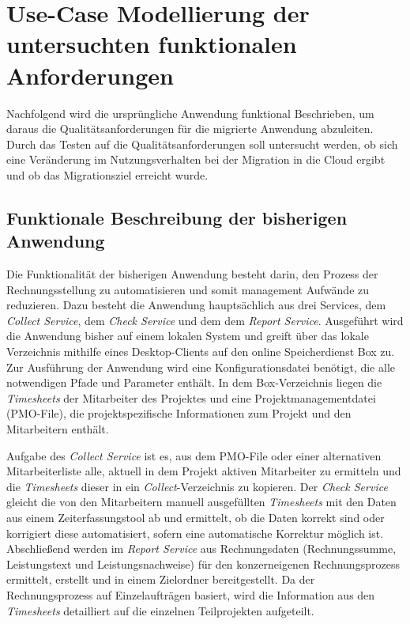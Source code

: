 \section{Use-Case Modellierung der untersuchten funktionalen Anforderungen}
\label{sec:use-case-modellierung}

Nachfolgend wird die ursprüngliche Anwendung funktional Beschrieben, um daraus die Qualitätsanforderungen für die migrierte Anwendung abzuleiten. Durch das Testen auf die Qualitätsanforderungen soll untersucht werden, ob sich eine Veränderung im Nutzungsverhalten bei der Migration in die Cloud ergibt und ob das Migrationsziel erreicht wurde.

\subsection{Funktionale Beschreibung der bisherigen Anwendung}
Die Funktionalität der bisherigen Anwendung besteht darin, den Prozess der Rechnungsstellung zu automatisieren und somit management Aufwände zu reduzieren. Dazu besteht die Anwendung hauptsächlich aus drei Services, dem \textit{Collect Service}, dem \textit{Check Service} und dem dem \textit{Report Service}. Ausgeführt wird die Anwendung bisher auf einem lokalen System und greift über das lokale Verzeichnis mithilfe eines Desktop-Clients auf den online Speicherdienst \gls{Box} zu. Zur Ausführung der Anwendung wird eine Konfigurationsdatei benötigt, die alle notwendigen Pfade und Parameter enthält. In dem \gls{Box}-Verzeichnis liegen die \textit{\glspl{Timesheet}} der Mitarbeiter des Projektes und eine Projektmanagementdatei (PMO-File), die projektspezifische Informationen zum Projekt und den Mitarbeitern enthält.

Aufgabe des \textit{Collect Service} ist es, aus dem PMO-File oder einer alternativen Mitarbeiterliste alle, aktuell in dem Projekt aktiven Mitarbeiter zu ermitteln und die \textit{\glspl{Timesheet}} dieser in ein \textit{Collect}-Verzeichnis zu kopieren. Der \textit{Check Service} gleicht die von den Mitarbeitern manuell ausgefüllten \textit{\glspl{Timesheet}} mit den Daten aus einem Zeiterfassungstool ab und ermittelt, ob die Daten korrekt sind oder korrigiert diese automatisiert, sofern eine automatische Korrektur möglich ist. Abschließend werden im \textit{Report Service} aus Rechnungsdaten (Rechnungssumme, Leistungstext und Leistungsnachweise) für den konzerneigenen Rechnungsprozess ermittelt, erstellt und in einem Zielordner bereitgestellt. Da der Rechnungsprozess auf Einzelaufträgen basiert, wird die Information aus den \textit{\glspl{Timesheet}} detailliert auf die einzelnen Teilprojekten aufgeteilt.

